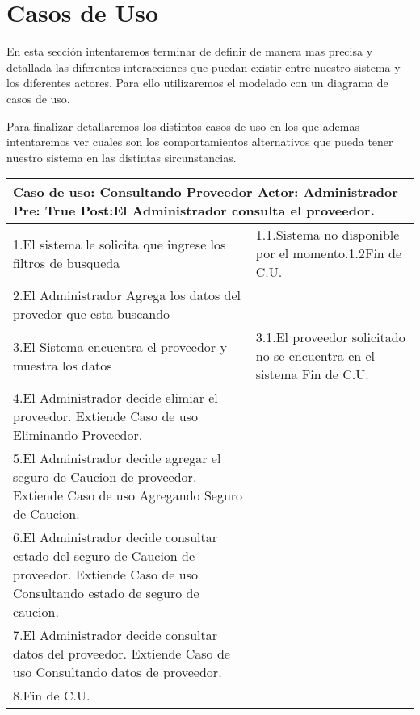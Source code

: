 \section{Casos de Uso}
 
En esta sección intentaremos terminar de definir de manera mas precisa y detallada las diferentes interacciones que puedan existir entre nuestro sistema y los diferentes actores. Para ello utilizaremos el modelado con un diagrama de casos de uso.

 Para finalizar detallaremos los distintos casos de uso en los que ademas intentaremos ver cuales son los comportamientos alternativos que pueda tener nuestro sistema en las distintas sircunstancias.


\begin{tabular}{|p{8cm}|p{8cm}|}
  \hline
  \multicolumn{2}{|p{16cm}|}{
	      \textbf{Caso de uso:} Consultando Proveedor \newline
		  \textbf{Actor:} Administrador\newline
		  \textbf{Pre:}  True\newline
		  \textbf{Post:}El Administrador consulta el proveedor. 
  }\\
  \hline
		1.El sistema le solicita que ingrese los filtros de busqueda  & 1.1.Sistema no  disponible por el momento.\newline 1.2Fin de C.U.\\
		\hline
		2.El Administrador Agrega los datos del provedor que esta buscando&	\\
		\hline
		3.El Sistema encuentra el proveedor y muestra los datos & 3.1.El proveedor solicitado no se encuentra en el sistema \newline 3.2 Fin de C.U.  \\
		\hline
		4.El Administrador decide elimiar el proveedor. Extiende Caso de uso Eliminando Proveedor.& \\
		\hline
		5.El Administrador decide agregar el seguro de Caucion de proveedor. Extiende Caso de uso Agregando Seguro de Caucion.& \\
		\hline
		6.El Administrador decide consultar estado del seguro de Caucion de proveedor. Extiende Caso de uso Consultando estado de seguro de caucion.& \\
		\hline
		7.El Administrador decide consultar datos del proveedor. Extiende Caso de uso Consultando datos de proveedor.& \\
		\hline
		8.Fin de C.U.& \\
		\hline
  \hline
\end{tabular}
